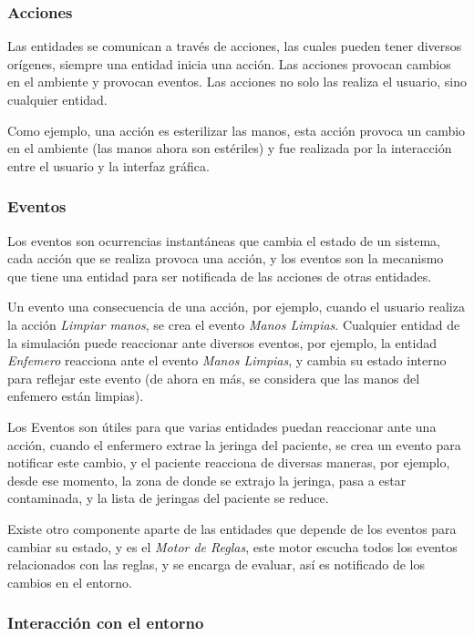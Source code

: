 \subsubsection{Acciones}

Las entidades se comunican a través de acciones, las cuales pueden tener
diversos orígenes, siempre una entidad inicia una acción. Las acciones provocan
cambios en el ambiente y provocan eventos. Las acciones no solo las
realiza el usuario, sino cualquier entidad.

Como ejemplo, una acción es esterilizar las manos, esta acción provoca un
cambio en el ambiente (las manos ahora son estériles) y fue realizada por la
interacción entre el usuario y la interfaz gráfica.

\subsubsection{Eventos}

Los eventos son ocurrencias instantáneas que cambia el estado de un
sistema\cite{banks2000dm}, cada acción que se realiza provoca una acción, y los
eventos son la mecanismo que tiene una entidad para ser notificada de las
acciones de otras entidades.

Un evento una consecuencia de una acción, por ejemplo, cuando el usuario 
realiza la acción \emph{Limpiar manos}, se crea el evento \emph{Manos Limpias}. 
Cualquier entidad de la simulación puede reaccionar ante diversos eventos, 
por ejemplo, la entidad \emph{Enfemero} reacciona ante el evento \emph{Manos
Limpias}, y cambia su estado interno para reflejar este evento (de ahora en 
más, se considera que las manos del enfemero están limpias).

Los Eventos son útiles para que varias entidades puedan reaccionar ante
una acción, cuando el enfermero extrae la jeringa del paciente, se crea un
evento para notificar este cambio, y el paciente reacciona de diversas maneras,
por ejemplo, desde ese momento, la zona de donde se extrajo la jeringa, pasa a 
estar contaminada, y la lista de jeringas del paciente se reduce. 

Existe otro componente aparte de las entidades que depende de los eventos 
para cambiar su estado, y es el \emph{Motor de Reglas}, este motor escucha
todos los eventos relacionados con las reglas, y se encarga de evaluar, así
es notificado de los cambios en el entorno.

\subsubsection{Interacción con el entorno}


